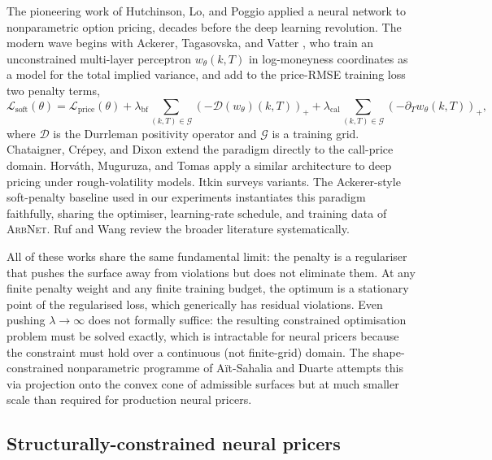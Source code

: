 \documentclass[largeformat]{interact}
\theoremstyle{plain}
\theoremstyle{definition}
\newcommand{\arbnet}{\textsc{ArbNet}}
\begin{document}
The pioneering work of Hutchinson, Lo, and Poggio \citeyearpar{hutchinson1994nonparametric} applied a neural network to nonparametric option pricing, decades before the deep learning revolution. The modern wave begins with Ackerer, Tagasovska, and Vatter \citeyearpar{ackerer2020deep}, who train an unconstrained multi-layer perceptron $w_\theta(k, T)$ in log-moneyness coordinates as a model for the total implied variance, and add to the price-RMSE training loss two penalty terms,
\begin{equation}
\label{eq:soft-penalty}
\mathcal{L}_{\mathrm{soft}}(\theta) = \mathcal{L}_{\mathrm{price}}(\theta) + \lambda_{\mathrm{bf}} \sum_{(k, T) \in \mathcal{G}} (-\mathcal{D}(w_\theta)(k, T))_+ + \lambda_{\mathrm{cal}} \sum_{(k, T) \in \mathcal{G}} (-\partial_T w_\theta(k, T))_+,
\end{equation}
where $\mathcal{D}$ is the Durrleman positivity operator and $\mathcal{G}$ is a training grid. Chataigner, Cr\'epey, and Dixon \citeyearpar{chataigner2020deep} extend the paradigm directly to the call-price domain. Horv\'ath, Muguruza, and Tomas \citeyearpar{horvath2021deep} apply a similar architecture to deep pricing under rough-volatility models. Itkin \citeyearpar{itkin2019deep} surveys variants. The Ackerer-style soft-penalty baseline used in our experiments instantiates this paradigm faithfully, sharing the optimiser, learning-rate schedule, and training data of \arbnet{}. Ruf and Wang \citeyearpar{ruf2020neural,ruf2019neural} review the broader literature systematically.

All of these works share the same fundamental limit: the penalty is a regulariser that pushes the surface away from violations but does not eliminate them. At any finite penalty weight and any finite training budget, the optimum is a stationary point of the regularised loss, which generically has residual violations. Even pushing $\lambda \to \infty$ does not formally suffice: the resulting constrained optimisation problem must be solved exactly, which is intractable for neural pricers because the constraint must hold over a continuous (not finite-grid) domain. The shape-constrained nonparametric programme of A{\"i}t-Sahalia and Duarte \citeyearpar{aitsahalia2003nonparametric} attempts this via projection onto the convex cone of admissible surfaces but at much smaller scale than required for production neural pricers.

\subsection{Structurally-constrained neural pricers}
\label{sec:related-structural}
\end{document}
